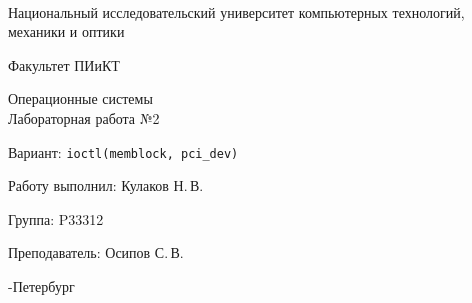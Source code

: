 \thispagestyle{empty}

\onecolumn
\begin{center}
	\
\vspace{1 cm}

\huge Национальный исследовательский университет компьютерных технологий, механики и оптики
\vspace{0.5cm}

\Huge Факультет ПИиКТ

\vspace{5cm}
\huge{Операционные системы  \\
Лабораторная работа №2}
\vspace{0.2cm}
 
\LARGE Вариант: 
\Verb"ioctl(memblock, pci_dev)"

\end{center}
\vspace{6 cm}

\begin{flushright}
\Large

Работу выполнил: Кулаков Н.\,В.
\smallskip

Группа: P33312
\smallskip

Преподаватель: Осипов С.\,В.
\smallskip

\vspace{4cm}
	
-Петербург

\end{flushright}
